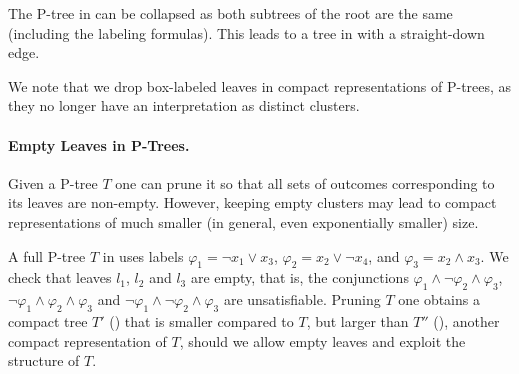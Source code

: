 The P-tree in  can be collapsed as both 
subtrees of the root are the same (including the labeling formulas). This 
leads to a tree in  with a straight-down edge.
We note that we drop box-labeled leaves in compact representations 
of P-trees, as they no longer have an interpretation as distinct clusters.

\paragraph{\bf Empty Leaves in P-Trees.} Given a P-tree $T$ one can prune it
so that all sets of outcomes corresponding to its leaves are non-empty.
However, keeping empty clusters may lead to compact representations of much
smaller (in general, even exponentially smaller) size.

A full P-tree $T$ in  uses labels
$\varphi_1=\neg x_1 \vee x_3$, $\varphi_2=x_2 \vee \neg x_4$, and
$\varphi_3=x_2 \wedge x_3$.
We check that leaves $l_1$, $l_2$ and $l_3$ are empty, that is,
the conjunctions $\varphi_1 \wedge \neg \varphi_2 \wedge \varphi_3$,
$\neg \varphi_1 \wedge \varphi_2 \wedge \varphi_3$ and
$\neg \varphi_1 \wedge \neg \varphi_2 \wedge \varphi_3$ are
unsatisfiable.
Pruning $T$ one obtains a compact tree $T'$ () that is
smaller compared to $T$, but larger than $T''$ (), another compact 
representation of $T$, should we allow empty leaves and exploit
the structure of $T$.

